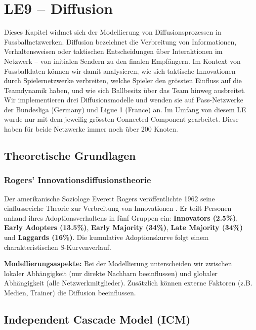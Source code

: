 \section{LE9 -- Diffusion}

Dieses Kapitel widmet sich der Modellierung von Diffusionsprozessen in Fussballnetzwerken. Diffusion bezeichnet die Verbreitung von Informationen, Verhaltensweisen oder taktischen Entscheidungen über Interaktionen im Netzwerk -- von initialen Sendern zu den finalen Empfängern. Im Kontext von Fussballdaten können wir damit analysieren, wie sich taktische Innovationen durch Spielernetzwerke verbreiten, welche Spieler den grössten Einfluss auf die Teamdynamik haben, und wie sich Ballbesitz über das Team hinweg ausbreitet. Wir implementieren drei Diffusionsmodelle und wenden sie auf Pass-Netzwerke der Bundesliga (Germany) und Ligue 1 (France) an. Im Umfang von diesem LE wurde nur mit dem jeweilig grössten Connected Component gearbeitet. Diese haben für beide Netzwerke immer noch über 200 Knoten.

\subsection{Theoretische Grundlagen}

\subsubsection{Rogers' Innovationsdiffusionstheorie}

Der amerikanische Soziologe Everett Rogers veröffentlichte 1962 seine einflussreiche Theorie zur Verbreitung von Innovationen \cite{karnowski_diffusion_2016}. Er teilt Personen anhand ihres Adoptionsverhaltens in fünf Gruppen ein: \textbf{Innovators (2.5\%)}, \textbf{Early Adopters (13.5\%)}, \textbf{Early Majority (34\%)}, \textbf{Late Majority (34\%)} und \textbf{Laggards (16\%)}. Die kumulative Adoptionskurve folgt einem charakteristischen S-Kurvenverlauf.

\textbf{Modellierungsaspekte:} Bei der Modellierung unterscheiden wir zwischen lokaler Abhängigkeit (nur direkte Nachbarn beeinflussen) und globaler Abhängigkeit (alle Netzwerkmitglieder). Zusätzlich können externe Faktoren (z.B. Medien, Trainer) die Diffusion beeinflussen.

\subsection{Independent Cascade Model (ICM)}

